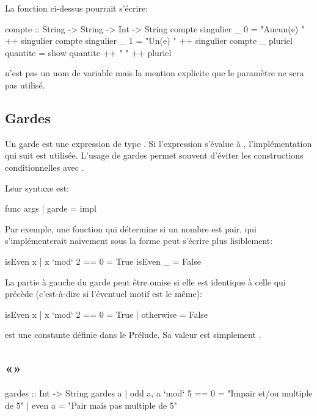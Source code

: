 La fonction  ci-dessus pourrait s'écrire:

\begin{haskellcode}
compte :: String -> String -> Int -> String
compte singulier _ 0 = "Aucun(e) " ++ singulier
compte singulier _ 1 = "Un(e) " ++ singulier
compte _ pluriel quantite = show quantite ++ " " ++  pluriel
\end{haskellcode}

\hs{_} n'est pas un nom de variable mais la mention explicite que le paramètre ne sera pas utilisé.

\subsection{Gardes}
\label{guards}

Un garde est une expression de type . Si l'expression s'évalue à , l'implémentation qui suit est utilisée. L'usage de gardes permet souvent d'éviter les constructions conditionnelles avec  .

Leur syntaxe est:

\begin{haskellcode}
func args | garde = impl
\end{haskellcode}

Par exemple, une fonction qui détermine si un nombre est pair, qui s'implémenterait naïvement sous la forme  peut s'écrire plus lisiblement:

\begin{haskellcode}
isEven x | x `mod` 2 == 0 = True
isEven _ = False
\end{haskellcode}

La partie à gauche du garde peut être omise si elle est identique à celle qui précède (c'est-à-dire si l'éventuel motif est le même):

\begin{haskellcode}
isEven x | x `mod` 2 == 0 = True
         | otherwise = False
\end{haskellcode}

\begin{infobox}
 est une constante définie dans le Prélude. Sa valeur est simplement .
\end{infobox}

\subsection{«»}


\begin{haskellcode}
gardes :: Int -> String
gardes a | odd a, a `mod` 5 == 0 = "Impair et/ou multiple de 5"
         | even a = "Pair mais pas multiple de 5"
\end{haskellcode}

\todo{}
